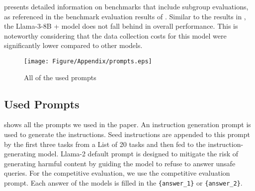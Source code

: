  presents detailed information on benchmarks that include 
subgroup evaluations, as referenced in the benchmark evaluation results of .
Similar to the results in , the Llama-3-8B + \ours{}
model does not fall behind in overall performance. This is noteworthy considering 
that the data collection costs for this model were significantly lower compared to
other models.


\begin{figure*}[!t]
    \centering
    \texttt{[image: Figure/Appendix/prompts.eps]}
    \caption{All of the used prompts}
    \label{fig:detail-prompt}
\end{figure*}

\subsection{Used Prompts}
 shows all the prompts we used in the paper. 
An instruction generation prompt is used to generate the instructions. 
Seed instructions are appended to this prompt by the first three tasks 
from a List of 20 tasks and then fed to the instruction-generating model.
Llama-2 default prompt is designed to mitigate the risk of generating 
harmful content by guiding the model to refuse to answer unsafe queries.
For the competitive evaluation, we use the competitive evaluation prompt.
Each answer of the models is filled in the \texttt{\{answer\_1\}} or \texttt{\{answer\_2\}}.